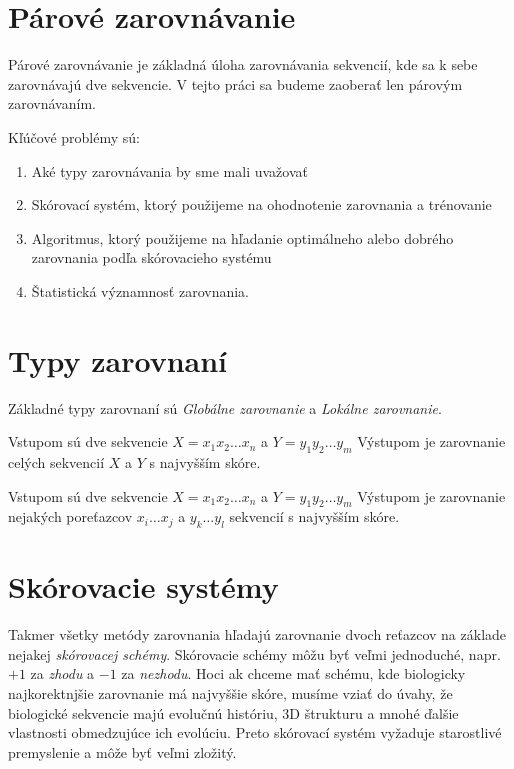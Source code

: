 \section{Párové zarovnávanie}
Párové zarovnávanie je základná úloha zarovnávania sekvencií, kde sa k sebe zarovnávajú dve sekvencie. V tejto práci sa budeme zaoberať len párovým zarovnávaním.

Kľúčové problémy sú:
\begin{enumerate}
\item Aké typy zarovnávania by sme mali uvažovať
\item Skórovací systém, ktorý použijeme na ohodnotenie zarovnania a trénovanie
\item Algoritmus, ktorý použijeme na hľadanie optimálneho alebo dobrého zarovnania podľa skórovacieho systému
\item Štatistická významnosť zarovnania.
\end{enumerate}

\cite{durbin}

\section{Typy zarovnaní}
Základné typy zarovnaní sú \textit{Globálne zarovnanie} a \textit{Lokálne zarovnanie}.
\begin{df}
Vstupom sú dve sekvencie $X = x_1x_2\dots x_n$ a $Y = y_1y_2\dots y_m$
Výstupom je zarovnanie celých sekvencií $X$ a $Y$ s najvyšším skóre.
\end{df}

\begin{df}
Vstupom sú dve sekvencie $X = x_1x_2\dots x_n$ a $Y = y_1y_2\dots y_m$
Výstupom je zarovnanie nejakých poreťazcov $x_i\dots x_j$ a $y_k\dots y_l$ sekvencií s najvyšším skóre.
\end{df}
\cite{skripta}

\section{Skórovacie systémy}
Takmer všetky metódy zarovnania hľadajú zarovnanie dvoch reťazcov na základe nejakej \textit{skórovacej schémy}. Skórovacie schémy môžu byť veľmi jednoduché, napr. $+1$ za \textit{zhodu} a $-1$ za \textit{nezhodu}. Hoci ak chceme mať schému, kde biologicky najkorektnjšie zarovnanie má najvyššie skóre, musíme vziať do úvahy, že biologické sekvencie majú evolučnú históriu, 3D štrukturu a mnohé ďalšie vlastnosti obmedzujúce ich evolúciu. Preto skórovací systém vyžaduje starostlivé premyslenie a môže byť veľmi zložitý.
\cite{durbin}

